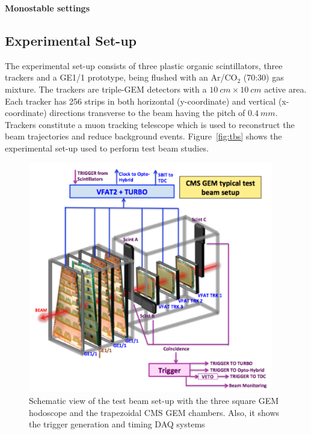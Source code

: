 \textbf{Monostable settings}



\subsection{Experimental Set-up}
The experimental set-up consists of three plastic organic scintillators, three trackers and a GE1/1 prototype, being flushed with an Ar/CO$_{2}$ (70:30) gas mixture. The trackers are triple-GEM detectors with a $10~cm\times10~cm$ active area. Each tracker has 256 strips in both horizontal (y-coordinate) and vertical (x-coordinate) directions transverse to the beam having the pitch of $0.4~mm$. Trackers constitute a muon tracking telescope which is used to reconstruct the beam trajectories and reduce background events. Figure~\ref{fig:tbs} shows the experimental set-up used to perform test beam studies.
\begin{figure}[!htbp]
\centering
\includegraphics[width=0.95\textwidth]{figures/GEM/tb_exptsetup_copy.png}
\caption{Schematic view of the test beam set-up with the three square GEM hodoscope and the trapezoidal CMS GEM chambers. Also, it shows the trigger generation and timing DAQ systems}\label{fig:daq}
\end{figure}
